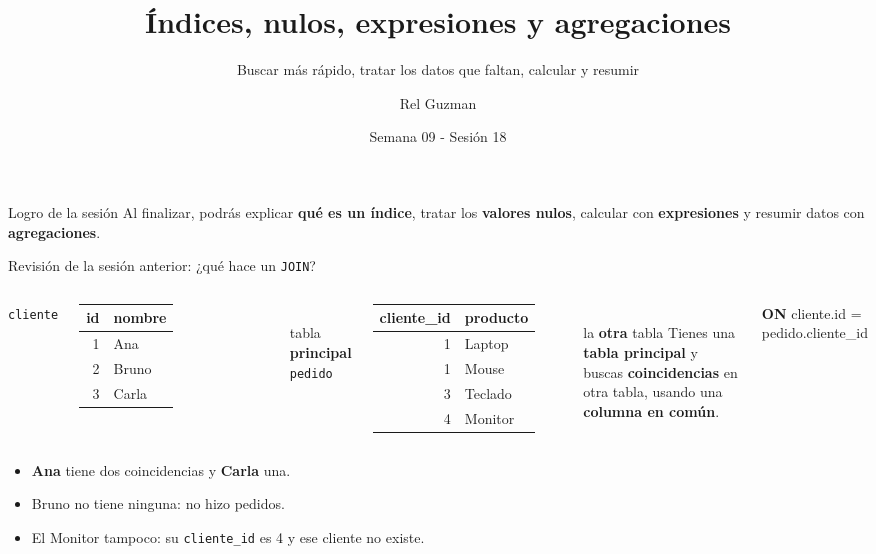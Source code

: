 \documentclass[aspectratio=169,10pt,c]{beamer}
\title{Índices, nulos, expresiones y agregaciones}
\subtitle{Buscar más rápido, tratar los datos que faltan, calcular y resumir}
\date{Semana 09 - Sesión 18}
\author{Rel Guzman}
\newcommand{\tbl}[1]{\textcolor{utpNaranja}{\texttt{#1}}}
\newcommand{\kw}[1]{\textcolor{utpRojo}{\textbf{#1}}}
\newcommand{\mal}[1]{{\setlength{\fboxsep}{1.2pt}\colorbox{utpRojo!18}{#1}}}
\newenvironment{sqlcode}[1][.86\textwidth]
  {\begin{center}\begin{lrbox}{\sqlbuf}\begin{minipage}{#1}\ttfamily\footnotesize\vspace{6pt}\raggedright}
  {\vspace{6pt}\end{minipage}\end{lrbox}\colorbox{utpGrisClaro}{\usebox{\sqlbuf}}\end{center}}
\newcommand{\cab}[1]{\normalfont\bfseries #1}
\newcommand{\tablacliente}{%
  \centering\tbl{cliente}\\[4pt]
  \scriptsize\ttfamily
  \begin{tabular}{rl}
  \toprule
  \cab{id} & \cab{nombre} \\
  \midrule
  1 & Ana \\
  2 & Bruno \\
  3 & Carla \\
  \bottomrule
  \end{tabular}}
\newcommand{\tablapedido}{%
  \centering\tbl{pedido}\\[4pt]
  \scriptsize\ttfamily
  \begin{tabular}{rl}
  \toprule
  \cab{cliente\_id} & \cab{producto} \\
  \midrule
  1 & Laptop \\
  1 & Mouse \\
  3 & Teclado \\
  4 & Monitor \\
  \bottomrule
  \end{tabular}}
\begin{document}
{\maketitle}

\begin{frame}[c]
\begin{block}{Logro de la sesión}
Al finalizar, podrás explicar \textbf{qué es un índice}, tratar los \textbf{valores nulos}, calcular con \textbf{expresiones} y resumir datos con \textbf{agregaciones}.
\end{block}
\end{frame}
\begin{frame}{Revisión de la sesión anterior: ¿qué hace un \texttt{JOIN}?}
\begin{columns}[c,onlytextwidth]
\tablacliente\\[3pt]
{\normalfont\scriptsize\color{utpGris}tabla \textbf{principal}}
\tablapedido\\[3pt]
{\normalfont\scriptsize\color{utpGris}la \textbf{otra} tabla}
\small Tienes una \textbf{tabla principal} y buscas \textbf{coincidencias} en otra tabla, usando una \textbf{columna en común}.
\begin{sqlcode}[\textwidth]
\scriptsize
\kw{ON} cliente.id = pedido.cliente\_id
\end{sqlcode}
\end{columns}
\vspace{0.25cm}
\begin{itemize}\setlength\itemsep{5pt}
  \item \textbf{Ana} tiene dos coincidencias y \textbf{Carla} una.
  \item \mal{Bruno} no tiene ninguna: no hizo pedidos.
  \item El \mal{Monitor} tampoco: su \texttt{cliente\_id} es 4 y ese cliente no existe.
\end{itemize}
\vspace{0.2cm}
\end{frame}
\end{document}

